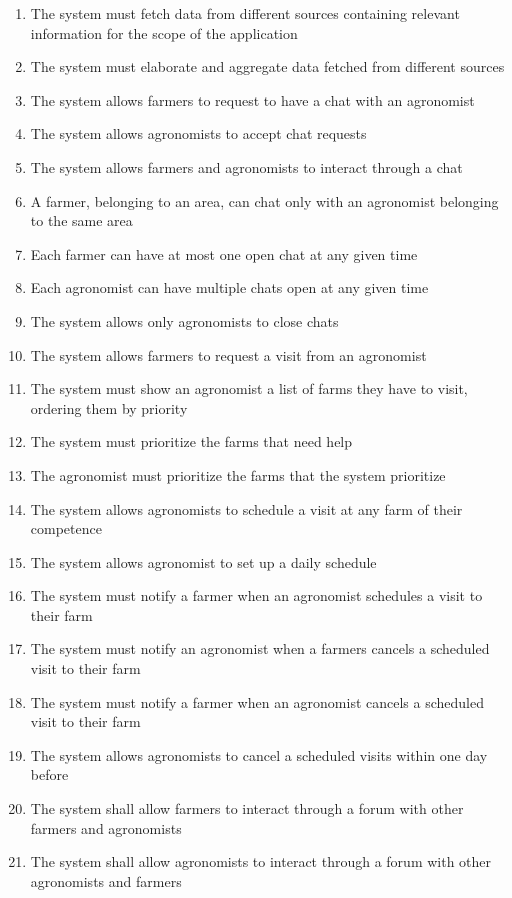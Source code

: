 \documentclass[10pt]{report}
\begin{document}
\begin{enumerate} [label=(R\arabic*), font=\itshape]
    \item The system must fetch data from different sources containing relevant information for the scope of the application
    \item The system must elaborate and aggregate data fetched from different sources
    \item The system allows farmers to request to have a chat with an agronomist
    \item The system allows agronomists to accept chat requests
    \item The system allows farmers and agronomists to interact through a chat
    \item A farmer, belonging to an area, can chat only with an agronomist belonging to the same area
    \item Each farmer can have at most one open chat at any given time
    \item Each agronomist can have multiple chats open at any given time
    \item The system allows only agronomists to close chats
    \item The system allows farmers to request a visit from an agronomist
    \item The system must show an agronomist a list of farms they have to visit, ordering them by priority
    \item The system must prioritize the farms that need help
    \item The agronomist must prioritize the farms that the system prioritize
    \item The system allows agronomists to schedule a visit at any farm of their competence
    \item The system allows agronomist to set up a daily schedule
    \item The system must notify a farmer when an agronomist schedules a visit to their farm
    \item The system must notify an agronomist when a farmers cancels a scheduled visit to their farm
    \item The system must notify a farmer when an agronomist cancels a scheduled visit to their farm
    \item The system allows agronomists to cancel a scheduled visits within one day before
    \item The system shall allow farmers to interact through a forum with other farmers and agronomists
    \item The system shall allow agronomists to interact through a forum with other agronomists and farmers

\end{enumerate}
\end{document}
